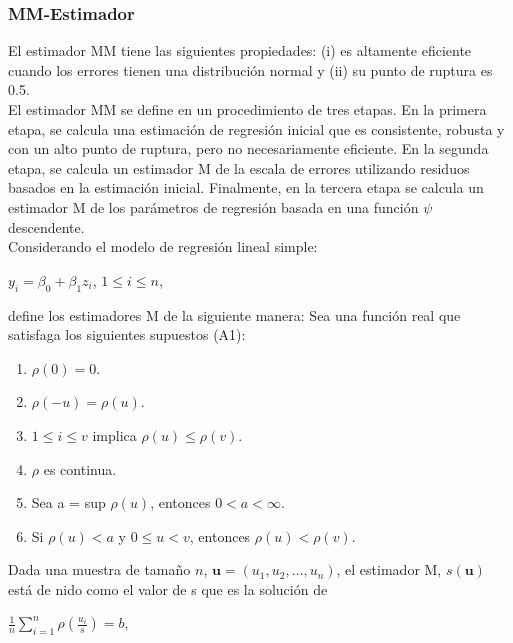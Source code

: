 \subsubsection{MM-Estimador \parencite{yohai-1987}}
El estimador MM tiene las siguientes propiedades: (i) es altamente eficiente cuando los errores tienen una distribución normal y (ii) su punto de ruptura es 0.5.\\

El estimador MM se define en un procedimiento de tres etapas. En la primera etapa, se calcula una estimación de regresión inicial que es consistente, robusta y con un alto punto de ruptura, pero no necesariamente eficiente. En la segunda etapa, se calcula un estimador M de la escala de errores utilizando residuos basados en la estimación inicial. Finalmente, en la tercera etapa se calcula un estimador M de los parámetros de regresión basada en una función $\psi$ descendente.\\

Considerando el modelo de regresión lineal simple:
\begin{center}
$y_{i}= \beta_{0} + \beta_{1}z_{i}$, $1 \leq i \leq n, $
\end{center}

\textcite{huber-1981} define los estimadores M de la siguiente manera: Sea una función real que satisfaga los siguientes supuestos (A1):

\begin{enumerate}[label=\roman*.]
	\item $\rho(0) = 0$.
	\item   $\rho(-u) =  \rho(u)$.
	\item $1 \leq i \leq v$ implica $\rho(u) \leq  \rho(v)$.
	\item $\rho$ es continua.
	\item Sea a = sup $\rho(u)$, entonces $0<a< \infty$.
	\item Si $\rho(u) < a $ y $0 \leq  u < v $, entonces  $\rho(u) <  \rho(v)$.
\end{enumerate}

Dada una muestra de tamaño $n$, $ \mathbf{u} = (u_{1}, u_{2}, \dots , u_{n})$,  el estimador M, $s(\mathbf{u})$ está de nido como el valor de s que es la solución de\\

\begin{center}
	$\frac{1}{n} \sum_{i=1}^{n} \rho( \frac{u_{i}}{s}) = b$,\\
\end{center}

